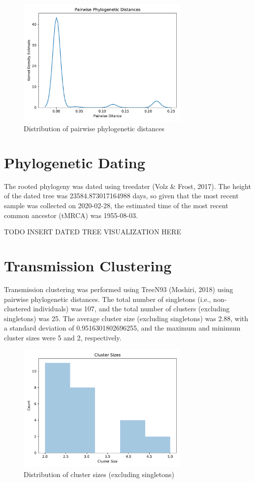 \documentclass{article}
\begin{document}
\begin{figure}[h]
\centering
\includegraphics[width=0.75\textwidth]{./figs/pairwise_distances_tree.pdf}
\caption{Distribution of pairwise phylogenetic distances}
\end{figure}

\section{Phylogenetic Dating}
The rooted phylogeny was dated using treedater (Volz \& Frost, 2017).
The height of the dated tree was 23584.873017164988 days,
so given that the most recent sample was collected on 2020-02-28,
the estimated time of the most recent common ancestor (tMRCA) was 1955-08-03.


TODO INSERT DATED TREE VISUALIZATION HERE


\section{Transmission Clustering}
Transmission clustering was performed using TreeN93 (Moshiri, 2018) using pairwise phylogenetic distances.
The total number of singletons (i.e., non-clustered individuals) was 107,
and the total number of clusters (excluding singletons) was 25.
The average cluster size (excluding singletons) was 2.88,
with a standard deviation of 0.9516301802696255,
and the maximum and minimum cluster sizes were 5 and 2, respectively.


\begin{figure}[h]
\centering
\includegraphics[width=0.75\textwidth]{./figs/cluster_sizes.pdf}
\caption{Distribution of cluster sizes (excluding singletons)}
\end{figure}
\end{document}
